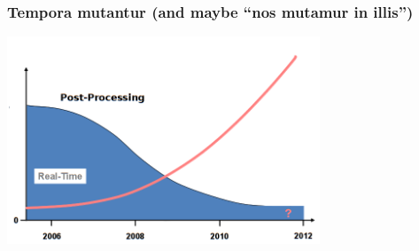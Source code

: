 \documentclass[10pt]{beamer}
\begin{document}

\begin{frame}
\frametitle{Tempora mutantur (and maybe ``nos mutamur in illis'')}

\begin{center}
  \includegraphics[width=0.7\textwidth,angle=0]{pp_vs_rt.png}
\end{center}

\end{frame}



\begin{frame}
\frametitle{}

\end{frame}


\begin{frame}
\frametitle{}

\end{frame}


\begin{frame}
\frametitle{}

\end{frame}
\end{document}
